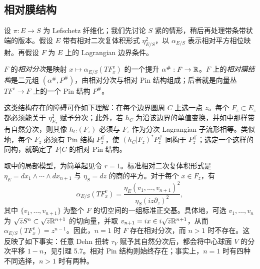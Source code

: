 \subsection{相对膜结构}\label{sec:17i}
设 $\pi:E\to S$ 为 Lefschetz 纤维化；我们先讨论 $S$ 紧的情形，稍后再处理带条带状端的版本。假设 $E$ 带有相对二次复体积形式 $\eta^2_{E/S}$，以 $\alpha_{E/S}$ 表示相对平方相位映射。再假设 $F$ 为 $E$ 上的 Lagrangian 边界条件。
\begin{definition*}
$F$ 的\emph{相对分次}是映射 $x\mapsto\alpha_{E/S}(TF_x^v)$ 的一个提升 $\alpha^\#:F\to\mathbb R$。$F$ 上的\emph{相对膜结构}是二元组 $(\alpha^\#,P^\#)$，由相对分次与相对 Pin 结构组成；后者就是向量丛
$TF^v\to F$ 上的一个 Pin 结构 $P^\#$。
\end{definition*}
这类结构存在的障碍可作如下理解：在每个边界圆周 $C$ 上选一点 $z$。每个 $F_z\subset E_z$ 都必须能关于 $\eta^2_{E_z}$ 赋予分次；此外，若 $h_C$ 为沿该边界的单值变换，并如中那样带有自然分次，则其像 $h_C(F_z)$ 必须与 $F_z$ 作为分次 Lagrangian 子流形相等。类似地，每个 $F_z$ 必须有 Pin 结构 $P_z^\#$，使 $(h_C|F_z)^*P_z^\#$ 同构于 $P_z^\#$；选定一个这样的同构，就确定了 $F|C$ 的相对 Pin 结构。

\begin{example}\label{st:17.14}
取中的局部模型，为简单起见令 $r=1$。标准相对二次复体积形式是 $\eta_E=dx_1\wedge\cdots\wedge dx_{n+1}$ 与 $\eta_S=dz$ 的商的平方。对于每个 $x\in F_z$，有
\[
\alpha_{E/S}(TF_x^v)=\frac{\eta_E(v_1,\ldots,v_{n+1})^2}{\eta_S(iz\partial_z)^2},
\]
其中 $\{v_1,\ldots,v_{n+1}\}$ 为整个 $F$ 的切空间的一组标准正交基。具体地，可选 $v_1,\ldots,v_n$ 为 $\sqrt zS^n\subset\sqrt z\mathbb R^{n+1}$ 的切向量，并取 $v_{n+1}=ix\in i\sqrt z\mathbb R^{n+1}$，从而 $\alpha_{E/S}(TF_x^v)=z^{n-1}$。因此，$n=1$ 时 $F$ 存在相对分次，而 $n>1$ 时不存在。这反映了如下事实：任意 Dehn 扭转 $\tau_V$ 赋予其自然分次后，都会将中心球面 $V$ 的分次平移 $1-n$，见引理 5.7。相对 Pin 结构则始终存在；事实上，$n=1$ 时有四种不同选择，$n>1$ 时有两种。
\end{example}

